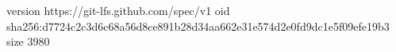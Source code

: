 version https://git-lfs.github.com/spec/v1
oid sha256:d7724c2c3d6c68a56d8ce891b28d34aa662e31e574d2e0fd9dc1e5f09efe19b3
size 3980
